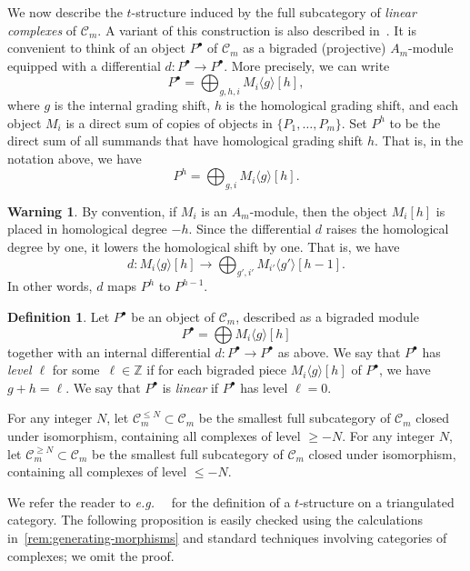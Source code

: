 \documentclass{amsart}
\theoremstyle{definition}
\newtheorem{definition}[theorem]{Definition}
\newtheorem{warning}[theorem]{Warning}
\newcommand{\eg}{\textit{e.g.}~} %
\newcommand{\darkblue}{\color{darkblue}} %
\newcommand{\defn}[1]{\textsl{\darkblue #1}} %
\begin{document}
We now describe the \(t\)-structure induced by the full subcategory of \defn{linear complexes} of \(\mathcal{C}_m\).
A variant of this construction is also described in~\cite[Sect.~2.5]{lic.que:21}.
It is convenient to think of an object \(P^{\bullet}\) of \(\mathcal{C}_m\) as a bigraded (projective) \(A_m\)-module equipped with a differential \(d \colon P^{\bullet} \to P^{\bullet}\).
More precisely, we can write
\[
P^{\bullet} = \bigoplus_{g,h,i} M_i\langle g \rangle[h],
\]
where \(g\) is the internal grading shift, \(h\) is the homological grading shift, and 
each object \(M_i\) is a direct sum of copies of objects in \(\{P_1,\ldots, P_m\}\).
Set \(P^h\) to be the direct sum of all summands that have homological grading shift \(h\).
That is, in the notation above, we have
\[
P^{h} = \bigoplus_{g,i} M_i\langle g \rangle[h].
\]

\begin{warning}
  By convention, if \(M_i\) is an \(A_m\)-module, then the object \(M_i[h]\) is placed in homological degree \(-h\).
  Since the differential \(d\) raises the homological degree by one, it lowers the homological shift by one.
  That is, we have
  \[d \colon M_i\langle g \rangle[h] \to \bigoplus_{g',i'} M_{i'}\langle g' \rangle[h-1].\]
  In other words, \(d\) maps \(P^h\) to \(P^{h-1}\).
\end{warning}

\begin{definition}
\label{def:linear-complex}
Let \(P^{\bullet}\) be an object of \(\mathcal{C}_m\), described as a bigraded module
\[
P^{\bullet} = \bigoplus M_i\langle g \rangle[h]
\]
together with an internal differential \(d \colon P^{\bullet} \to P^{\bullet}\) as above.
We say that \(P^{\bullet}\) has \defn{level \(\ell\)} for some~\(\ell \in \mathbb{Z}\) if for each bigraded piece \(M_i \langle g \rangle[h]\) of \(P^{\bullet}\), we have \(g + h = \ell\).
We say that \(P^{\bullet}\) is \defn{linear} if \(P^{\bullet}\) has level \(\ell = 0\).
\end{definition}

For any integer \(N\), let \(\mathcal{C}_m^{\le N} \subset \mathcal{C}_m\) be the smallest full subcategory of \(\mathcal{C}_m\) closed under isomorphism, containing all complexes of level \(\geq -N\).
For any integer \(N\), let \(\mathcal{C}_m^{\geq N} \subset \mathcal{C}_m\) be the smallest full subcategory of \(\mathcal{C}_m\) closed under isomorphism, containing all complexes of level \(\leq -N\).

We refer the reader to \eg~\cite[Sect.~1.3]{bel.ber.del:82} for the definition of a \(t\)-structure on a triangulated category.
The following proposition is easily checked using the calculations in~\cref{rem:generating-morphisms} and standard techniques involving categories of complexes; we omit the proof.
\end{document}
